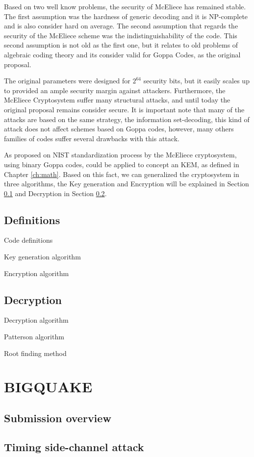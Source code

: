 Based on two well know problems, the security of McEliece has remained stable. The first assumption was the hardness of generic decoding and it is NP-complete and is also consider hard on average. The second assumption that regards the security of the McEliece scheme was the indistinguishability of the code. This second assumption is not old as the first one, but it relates to old problems of algebraic coding theory and its consider valid for Goppa Codes, as the original proposal. 

The original parameters were designed for $2^{64}$ security bits, but it easily scales up to provided an ample security margin against attackers. Furthermore, the McEliece Cryptosystem suffer many structural attacks, and until today the original proposal remains consider secure. It is important note that many of the attacks are based on the same strategy, the information set-decoding, this kind of attack does not affect schemes based on Goppa codes, however, many others families of codes suffer several drawbacks with this attack. 

As proposed on NIST standardization process by \cite{classial, bigquake, others} the McEliece cryptosystem, using binary Goppa codes, could be applied to concept an KEM, as defined in Chapter \ref{ch:math}. Based on this fact, we can generalized the cryptosystem in three algorithms, the Key generation and Encryption will be explained in Section \ref{sub:mc-def} and Decryption in Section \ref{sub:mc-dec}.

\subsection{Definitions}
\label{sub:mc-def}
Code definitions

Key generation algorithm

Encryption algorithm

\subsection{Decryption}
\label{sub:mc-dec}
Decryption algorithm

Patterson algorithm

Root finding method


\section{BIGQUAKE}
\subsection{Submission overview}
\subsection{Timing side-channel attack}